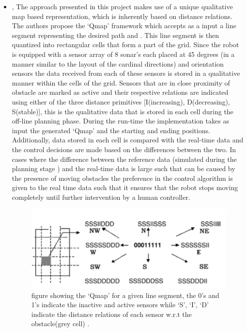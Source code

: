 \begin{itemize}
	\item \cite{sgouros2002qualitative}, The approach presented in this project makes use of a unique qualitative map based representation, which is inherently based on distance relations. The authors propose the `Qmap' framework which accepts as a input a line segment representing the desired path and . This line segment is then quantized into rectangular cells that form a part of the grid. Since the robot is equipped with a sensor array of 8 sonar's each placed at 45 degrees (in a manner similar to the layout of the cardinal directions) and orientation sensors the data received from each of these sensors is stored in a qualitative manner within the cells of the grid. Sensors that are in close proximity of obstacle are marked as active and their respective relations are indicated using either of the three distance primitives [I(increasing), D(decreasing), S(stable)], this is the qualitative data that is stored in each cell during the off-line planning phase. During the run-time the implementation takes as input the generated `Qmap' and the starting and ending positions. Additionally, data stored in each cell is compared with the real-time data and the control decisions are made based on the differences between the two. In cases where the difference between the reference data (simulated during the planning stage ) and the real-time data is large such that can be caused by the presence of moving obstacles the preference in the control algorithm is given to the real time data such that it ensures that the robot stops moving completely until further intervention by a human controller.
	\begin{figure}[h]
		\centering
		\includegraphics[scale=0.7]{images/Qmap}
		\caption{figure showing the `Qmap' for a given line segment, the 0's and 1's indicate the inactive and active sensors while `S', `I', `D' indicate the distance relations of each sensor w.r.t the obstacle(grey cell) \cite{sgouros2002qualitative}.}
		\label{fig:qmap}
	\end{figure}
	

\end{itemize}
